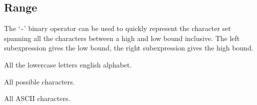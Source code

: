 
\subsection{Range}
{
	The `\texttt{-}' binary operator can be used to quickly represent the
	character set
	spanning all the characters between a high and low bound inclusive.
	The left subexpression gives the low bound, the right subexpression gives
	the high bound.
	
	\begin{itemize}
	{
		\item[\texttt{`a' - `z'}] All the lowercase letters english alphabet.
		
		\item[\texttt{0 - 255}] All possible characters.
		
		\item[\texttt{0 - 127}] All ASCII characters.
	}
	\end{itemize}
}
